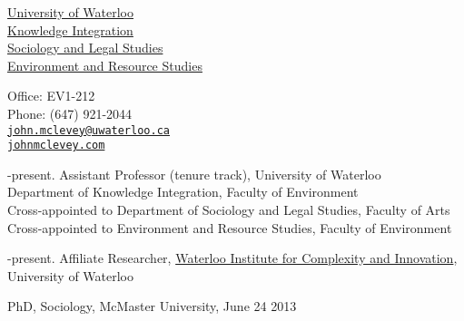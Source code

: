 \documentclass[11pt,usenames,dvipsnames]{article}
\makeatletter
\def\myemail{john.mclevey@uwaterloo.ca}
\def\myphone{(647) 921-2044}
\def\lastupdated{Last Updated: June 25, 2013}
\makeatother
\begin{document}
\begin{minipage}[t]{2.95in}
 \flushright \footnotesize \href{https://uwaterloo.ca/}{University of Waterloo} \\  \href{https://uwaterloo.ca/knowledge-integration/faculty-mclevey}{Knowledge Integration} \\ \href{http://sociology.uwaterloo.ca/}{Sociology and Legal Studies} \\ \href{https://uwaterloo.ca/environment-resource-studies/}{Environment and Resource Studies} \\
  \end{minipage}
\hfill     
\hfill
\begin{minipage}[t]{1.7in}
  \flushright \footnotesize Office: EV1-212 \\ Phone: \myphone \\ 
  {\scriptsize  \texttt{\href{mailto:\myemail}{\myemail}}} \\
  {\scriptsize  \texttt{\href{http://www.johnmclevey.com}{johnmclevey.com}}}\\
\end{minipage}


\bigskip

\reversemarginpar

\medskip 


-present. Assistant Professor (tenure track), University of Waterloo \\
\noindent Department of Knowledge Integration, Faculty of Environment \\
\noindent Cross-appointed to Department of Sociology and Legal Studies, Faculty of Arts \\
\noindent Cross-appointed to Environment and Resource Studies, Faculty of Environment \\
\smallskip

-present. Affiliate Researcher, \href{http://wici.ca/new/}{Waterloo Institute for Complexity and Innovation}, University of Waterloo \\


\medskip 
{}

\noindent PhD, Sociology, McMaster University, June 24 2013
\end{document}
